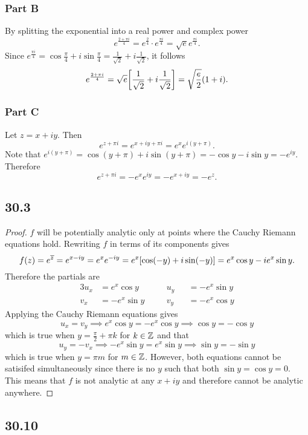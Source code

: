 \documentclass[12pt,titlepage]{extarticle}
\begin{document}
\subsubsection*{Part B}
By splitting the exponential into a real power and complex power
\[
    e^{\frac{2+\pi i}{4}} = e^{\frac{2}{4}} \cdot e^{\frac{\pi i}{4}} = \sqrt{e} e^{\frac{\pi i}{4}}
.\]
Since $e^{\frac{\pi i}{4}} = \cos \frac{\pi}{4} + i \sin \frac{\pi}{4} = \frac{1}{\sqrt{2}} + i \frac{1}{\sqrt{2}}$, it follows
\[
    e^{\frac{2+\pi i}{4}} = \sqrt{e} \qty[\frac{1}{\sqrt{2}} + i \frac{1}{\sqrt{2}}] = \sqrt{\frac{e}{2}} (1 + i)
.\]

\subsubsection*{Part C}
Let $z = x +iy$. Then
\[
    e^{z + \pi i} = e^{x + iy + \pi i} = e^x e^{i(y + \pi)}
.\]
Note that $e^{i(y+\pi)} = \cos(y + \pi) + i \sin(y + \pi) = -\cos y - i \sin y = - e^{iy}$. Therefore
\[
    e^{z + \pi i} = -e^x e^{iy} = -e^{x+ iy} = -e^z
.\]

\subsection*{30.3}
\begin{proof}
    $f$ will be potentially analytic only at points where the Cauchy Riemann equations hold. Rewriting $f$ in terms of its components gives
    \[
        f(z) = e^{\overline{z}} = e^{x - iy} = e^x e^{-iy} = e^x \qty[\cos(-y) + i \sin(-y)] = e^x \cos y - i e^x \sin y
    .\]
    Therefore the partials are
    \begin{alignat*}{3}
        u_x &= e^x \cos y &\quad& u_y &&= -e^x \sin y \\
        v_x &= -e^x \sin y && v_y &&= -e^x \cos y
    \end{alignat*}
    Applying the Cauchy Riemann equations gives
    \[
        u_x = v_y \implies e^x \cos y = -e^x \cos y \implies \cos y = -\cos y
    \]
    which is true when $y = \frac{\pi}{2} + \pi k$ for $k \in \mathbb{Z}$ and that
    \[
        u_y = -v_x \implies -e^x \sin y = e^x \sin y \implies \sin y = -\sin y
    \]
    which is true when $y = \pi m$ for $m \in \mathbb{Z}$. However, both equations cannot be satisifed simultaneously since there is no $y$ such that both $\sin y = \cos y = 0$. This means that $f$ is not analytic at any $x + iy$ and therefore cannot be analytic anywhere.
\end{proof}

\subsection*{30.10}
\end{document}
